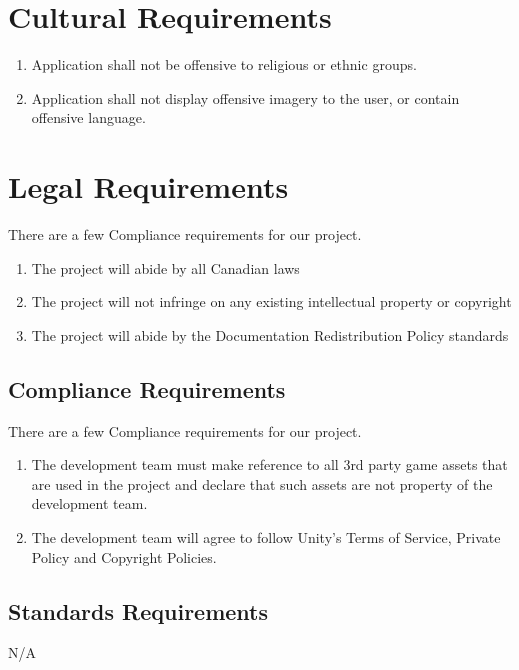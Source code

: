 \documentclass{article}
\begin{document}
\section{Cultural Requirements}
\begin{enumerate}[{CR}1. ]
	\item Application shall not be offensive to religious or ethnic groups.
	\item Application shall not display offensive imagery to the user, or contain offensive language.
\end{enumerate}
\section{Legal Requirements}
\quad There are a few Compliance requirements for our project.
\begin{enumerate}[{LR}1. ]
	\item The project will abide by all Canadian laws
	\item The project will not infringe on any existing intellectual property or copyright 
	\item The project will abide by the Documentation Redistribution Policy standards
\end{enumerate}
\subsection{Compliance Requirements}
\quad There are a few Compliance requirements for our project.
\begin{enumerate}[{COMPR}1. ]
	\item The development team must make reference to all 3rd party game assets that are used in the project and declare that such assets are not property of the development team.
	\item The development team will agree to follow Unity's Terms of Service, Private Policy and Copyright Policies.
\end{enumerate}
\subsection{Standards Requirements}
\quad N/A %
\end{document}
